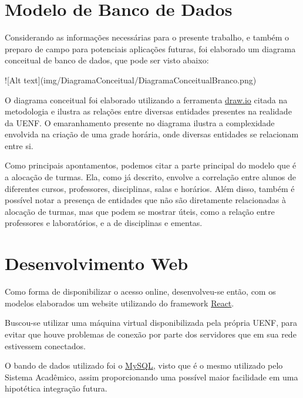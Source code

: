 \section{Modelo de Banco de Dados} %

    Considerando as informações necessárias para o presente trabalho, e também o preparo de campo para potenciais aplicações futuras, foi elaborado um diagrama conceitual de banco de dados, que pode ser visto abaixo:

    ![Alt text](img/DiagramaConceitual/DiagramaConceitualBranco.png)


    O diagrama conceitual foi elaborado utilizando a ferramenta \href{https://www.drawio.com/}{draw.io} citada na metodologia e ilustra as relações entre diversas entidades presentes na realidade da UENF. O emaranhamento presente no diagrama ilustra a complexidade envolvida na criação de uma grade horária, onde diversas entidades se relacionam entre si.

    Como principais apontamentos, podemos citar a parte principal do modelo que é a alocação de turmas. Ela, como já descrito, envolve a correlação entre alunos de diferentes cursos, professores, disciplinas, salas e horários. Além disso, também é possível notar a presença de entidades que não são diretamente relacionadas à alocação de turmas, mas que podem se mostrar úteis, como a relação entre professores e laboratórios, e a de disciplinas e ementas.

\section{Desenvolvimento Web} %

    Como forma de disponibilizar o acesso online, desenvolveu-se então, com os modelos elaborados um website utilizando do framework \href{https://react.dev/}{React}.

    Buscou-se utilizar uma máquina virtual disponibilizada pela própria UENF, para evitar que houve problemas de conexão por parte dos servidores que em sua rede estivessem conectados.

    O bando de dados utilizado foi o \href{https://dev.mysql.com/}{MySQL}, visto que é o mesmo utilizado pelo Sistema Acadêmico, assim proporcionando uma possível maior facilidade em uma hipotética integração futura.

